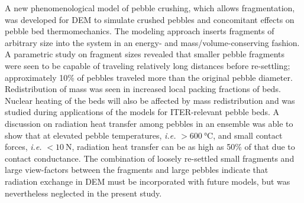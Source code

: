 A new phenomenological model of pebble crushing, which allows fragmentation, was developed for DEM to simulate crushed pebbles and concomitant effects on pebble bed thermomechanics. The modeling approach inserts fragments of arbitrary size into the system in an energy- and mass/volume-conserving fashion. A parametric study on fragment sizes revealed that smaller pebble fragments were seen to be capable of traveling relatively long distances before re-settling; approximately 10\% of pebbles traveled more than the original pebble diameter. Redistribution of mass was seen in increased local packing fractions of beds. Nuclear heating of the beds will also be affected by mass redistribution and was studied during applications of the models for ITER-relevant pebble beds. A discussion on radiation heat transfer among pebbles in an ensemble was able to show that at elevated pebble temperatures, \textit{i.e.} $>\SI{600}{\celsius}$, and small contact forces, \textit{i.e.} $< \SI{10}{\newton}$, radiation heat transfer can be as high as 50\% of that due to contact conductance. The combination of loosely re-settled small fragments and large view-factors between the fragments and large pebbles indicate that radiation exchange in DEM must be incorporated with future models, but was nevertheless neglected in the present study.

